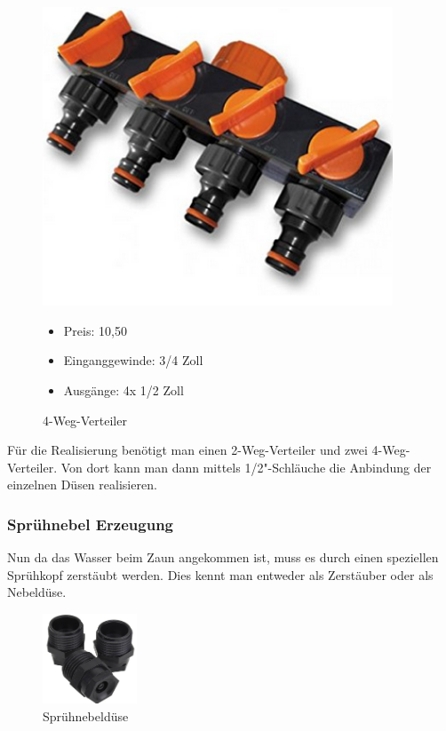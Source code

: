 \begin{figure}[H]
\begin{minipage}[t]{0.45\textwidth}
\includegraphics[width=0.93\textwidth]{fig/Gardena4Weg}
\caption{4-Weg-Verteiler}

\begin{itemize}
	\item{Preis: 10,50\textsf{\texteuro} \cite{preis4Weg}}
	\item{Einganggewinde: 3/4 Zoll}
	\item{Ausgänge: 4x 1/2 Zoll}
\end{itemize}
\end{minipage}
\end{figure}

Für die Realisierung benötigt man einen 2-Weg-Verteiler und zwei 4-Weg-Verteiler. Von dort kann man dann mittels 1/2"{}-Schläuche die Anbindung der einzelnen Düsen realisieren.

\subsubsection{Sprühnebel Erzeugung}
\label{sec:spruehnebel}



Nun da das Wasser beim Zaun angekommen ist, muss es durch einen speziellen Sprühkopf zerstäubt werden. Dies kennt man entweder als Zerstäuber oder als Nebeldüse. 

\begin{figure}[H]
\begin{center}
	\caption{Sprühnebeldüse}
	\includegraphics[width=0.25\textwidth]{fig/Spruehkopf}
\end{center}
\end{figure}

